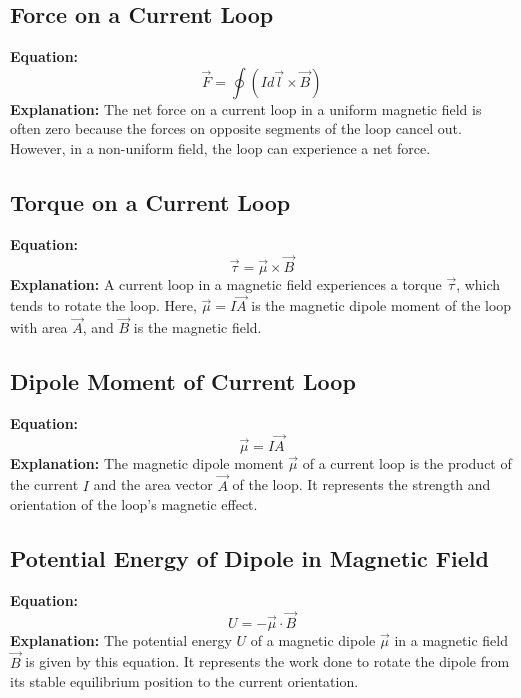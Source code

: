 \documentclass{article}
\begin{document}
\subsection*{Force on a Current Loop}
\textbf{Equation:} 
\[ \vec{F} = \oint (I d\vec{l} \times \vec{B}) \]
\textbf{Explanation:} 
The net force on a current loop in a uniform magnetic field is often zero because the forces on opposite segments of the loop cancel out. However, in a non-uniform field, the loop can experience a net force.

\subsection*{Torque on a Current Loop}
\textbf{Equation:} 
\[ \vec{\tau} = \vec{\mu} \times \vec{B} \]
\textbf{Explanation:} 
A current loop in a magnetic field experiences a torque \( \vec{\tau} \), which tends to rotate the loop. Here, \( \vec{\mu} = I\vec{A} \) is the magnetic dipole moment of the loop with area \( \vec{A} \), and \( \vec{B} \) is the magnetic field.

\subsection*{Dipole Moment of Current Loop}
\textbf{Equation:} 
\[ \vec{\mu} = I\vec{A} \]
\textbf{Explanation:} 
The magnetic dipole moment \( \vec{\mu} \) of a current loop is the product of the current \( I \) and the area vector \( \vec{A} \) of the loop. It represents the strength and orientation of the loop's magnetic effect.

\subsection*{Potential Energy of Dipole in Magnetic Field}
\textbf{Equation:} 
\[ U = -\vec{\mu} \cdot \vec{B} \]
\textbf{Explanation:} 
The potential energy \( U \) of a magnetic dipole \( \vec{\mu} \) in a magnetic field \( \vec{B} \) is given by this equation. It represents the work done to rotate the dipole from its stable equilibrium position to the current orientation.
\end{document}
